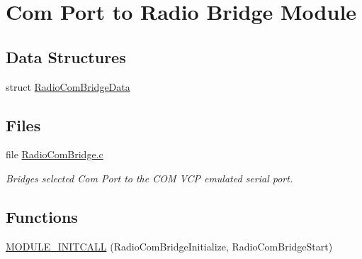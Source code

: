 \hypertarget{group___radio_com_bridge_module}{\section{\-Com \-Port to \-Radio \-Bridge \-Module}
\label{group___radio_com_bridge_module}
}
\subsection*{\-Data \-Structures}
\begin{DoxyCompactItemize}
\item 
struct \hyperlink{struct_radio_com_bridge_data}{\-Radio\-Com\-Bridge\-Data}
\end{DoxyCompactItemize}
\subsection*{\-Files}
\begin{DoxyCompactItemize}
\item 
file \hyperlink{_radio_com_bridge_8c}{\-Radio\-Com\-Bridge.\-c}
\begin{DoxyCompactList}\small\item\em \-Bridges selected \-Com \-Port to the \-C\-O\-M \-V\-C\-P emulated serial port. \end{DoxyCompactList}\end{DoxyCompactItemize}
\subsection*{\-Functions}
\begin{DoxyCompactItemize}
\item 
\hyperlink{group___radio_com_bridge_module_gac3af1d46c7b58e81ee6fe55f7310226c}{\-M\-O\-D\-U\-L\-E\-\_\-\-I\-N\-I\-T\-C\-A\-L\-L} (\-Radio\-Com\-Bridge\-Initialize, \-Radio\-Com\-Bridge\-Start)
\end{DoxyCompactItemize}


